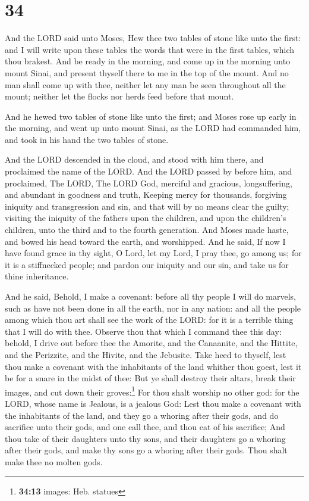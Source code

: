 \hypertarget{section-33}{%
\section{34}\label{section-33}}

 And the LORD said unto Moses, Hew thee two tables of
stone like unto the first: and I will write upon these tables the words
that were in the first tables, which thou brakest.  And be
ready in the morning, and come up in the morning unto mount Sinai, and
present thyself there to me in the top of the mount.  And
no man shall come up with thee, neither let any man be seen throughout
all the mount; neither let the flocks nor herds feed before that mount.

 And he hewed two tables of stone like unto the first; and
Moses rose up early in the morning, and went up unto mount Sinai, as the
LORD had commanded him, and took in his hand the two tables of stone.

 And the LORD descended in the cloud, and stood with him
there, and proclaimed the name of the LORD.  And the LORD
passed by before him, and proclaimed, The LORD, The LORD God, merciful
and gracious, longsuffering, and abundant in goodness and truth,
 Keeping mercy for thousands, forgiving iniquity and
transgression and sin, and that will by no means clear the guilty;
visiting the iniquity of the fathers upon the children, and upon the
children's children, unto the third and to the fourth generation.
 And Moses made haste, and bowed his head toward the
earth, and worshipped.  And he said, If now I have found
grace in thy sight, O Lord, let my Lord, I pray thee, go among us; for
it is a stiffnecked people; and pardon our iniquity and our sin, and
take us for thine inheritance.

 And he said, Behold, I make a covenant: before all thy
people I will do marvels, such as have not been done in all the earth,
nor in any nation: and all the people among which thou art shall see the
work of the LORD: for it is a terrible thing that I will do with thee.
 Observe thou that which I command thee this day: behold,
I drive out before thee the Amorite, and the Canaanite, and the Hittite,
and the Perizzite, and the Hivite, and the Jebusite. 
Take heed to thyself, lest thou make a covenant with the inhabitants of
the land whither thou goest, lest it be for a snare in the midst of
thee:  But ye shall destroy their altars, break their
images, and cut down their groves:\footnote{\textbf{34:13} images: Heb.
  statues}  For thou shalt worship no other god: for the
LORD, whose name is Jealous, is a jealous God:  Lest thou
make a covenant with the inhabitants of the land, and they go a whoring
after their gods, and do sacrifice unto their gods, and one call thee,
and thou eat of his sacrifice;  And thou take of their
daughters unto thy sons, and their daughters go a whoring after their
gods, and make thy sons go a whoring after their gods. 
Thou shalt make thee no molten gods.

